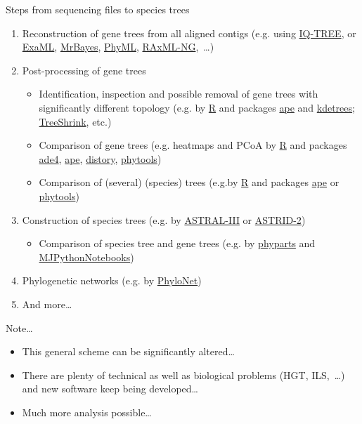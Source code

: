 \documentclass[compress, ucs, xelatex, 11pt, xcolor=x11names, aspectratio=169,
	hyperref={
		bookmarks=true,
		unicode=true,
		colorlinks=true,
		pdftitle={HybSeq course},
		plainpages=false,
		pdfauthor={Vojtech Zeisek},
		pdfsubject={Practical processing of HybSeq target enrichment sequencing data on computing grids like MetaCentrum},
		pdfcreator={XeLaTeX},
		pdfkeywords={BASH, command line, GNU, HybSeq, Linux, MetaCentrum, sequencing shell, target enrichment},
		linkcolor=Turquoise4, %
		anchorcolor=DodgerBlue4, %
		citecolor=DodgerBlue4, %
		filecolor=DodgerBlue4, %
		menucolor=Tan4, %
		urlcolor=DarkOliveGreen4, %
		pdftex},
	url={hyphens, lowtilde} %
	]{beamer}
\begin{document}
\begin{frame}[allowframebreaks]{Steps from sequencing files to species trees}
\begin{enumerate}
		\item Reconstruction of gene trees from all aligned contigs (e.g. using \href{http://www.iqtree.org/}{IQ-TREE}, or \href{https://github.com/stamatak/ExaML}{ExaML}, \href{https://nbisweden.github.io/MrBayes/}{MrBayes}, \href{http://www.atgc-montpellier.fr/phyml/}{PhyML}, \href{https://github.com/amkozlov/raxml-ng}{RAxML-NG},~\ldots)
		\item Post-processing of gene trees
		\begin{itemize}
			\item Identification, inspection and possible removal of gene trees with significantly different topology (e.g. by \href{https://www.r-project.org/}{R} and packages \href{https://cran.r-project.org/package=ape}{ape} and \href{https://cran.r-project.org/package=kdetrees}{kdetrees}; \href{https://github.com/uym2/TreeShrink}{TreeShrink}, etc.)
			\item Comparison of gene trees (e.g. heatmaps and PCoA by \href{https://www.r-project.org/}{R} and packages \href{https://cran.r-project.org/package=ade4}{ade4}, \href{https://cran.r-project.org/package=ape}{ape}, \href{https://cran.r-project.org/package=distory}{distory}, \href{https://cran.r-project.org/package=phytools}{phytools})
			\item Comparison of (several) (species) trees (e.g.by \href{https://www.r-project.org/}{R} and packages \href{https://cran.r-project.org/package=ape}{ape} or \href{https://cran.r-project.org/package=phytools}{phytools})
		\end{itemize}
		\item Construction of species trees (e.g. by \href{https://github.com/smirarab/ASTRAL}{ASTRAL-III} or \href{https://github.com/pranjalv123/ASTRID}{ASTRID-2})
		\begin{itemize}
			\item Comparison of species tree and gene trees (e.g. by \href{https://bitbucket.org/blackrim/phyparts}{phyparts} and \href{https://github.com/mossmatters/MJPythonNotebooks}{MJPythonNotebooks})
		\end{itemize}
		\item Phylogenetic networks (e.g. by \href{https://bioinfocs.rice.edu/PhyloNet}{PhyloNet})
		\item And more\ldots
	\end{enumerate}
	\vfill
	\begin{block}{Note\ldots}
		\begin{itemize}
			\item This general scheme can be significantly altered\ldots
			\item There are plenty of technical as well as biological problems (HGT, ILS,~\ldots) and new software keep being developed\ldots
			\item Much more analysis possible\ldots
		\end{itemize}
	\end{block}
	\vfill
\end{frame}
\end{document}

